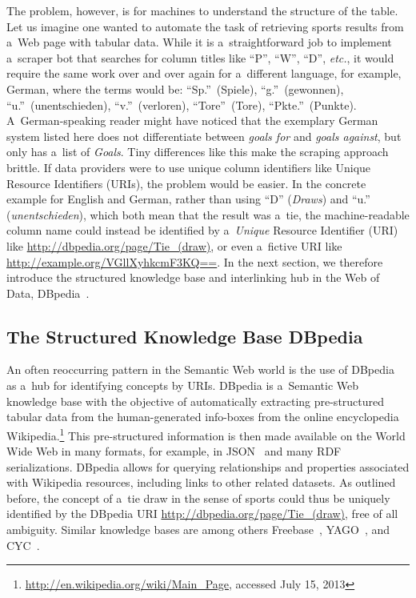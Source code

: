The problem, however, is for machines to understand
the structure of the table.
Let us imagine one wanted to automate the task
of retrieving sports results from a~Web page with tabular data.
While it is a~straightforward job to implement
a~scraper bot that searches for column titles
like ``P'', ``W'', ``D'', \emph{etc.},
it would require the same work over and over again
for a~different language,
for example, German, where the terms would be:
``Sp.''~(Spiele), ``g.''~(gewonnen), ``u.''~(unentschieden),
``v.''~(verloren), ``Tore''~(Tore), ``Pkte.''~(Punkte).
A~German-speaking reader might have noticed
that the exemplary German system listed here
does not differentiate between \emph{goals for}
and \emph{goals against}, but only has a~list of \emph{Goals}.
Tiny differences like this make the scraping approach brittle.
If data providers were to use unique column identifiers like
Unique Resource Identifiers (URIs),
the problem would be easier.
In the concrete example for English and German,
rather than using ``D'' (\emph{Draws})
and ``u.'' (\emph{unentschieden}),
which both mean that the result was a~tie,
the machine-readable column name could instead be identified by
a~\emph{Unique} Resource Identifier (URI) like
\url{http://dbpedia.org/page/Tie_(draw)},
or even a~fictive URI like \url{http://example.org/VGllXyhkcmF3KQ==}.
In the next section, we therefore introduce
the structured knowledge base and interlinking hub
in the Web of Data, DBpedia~\cite{auer2007dbpedia}.

\subsection{The Structured Knowledge Base DBpedia}

An often reoccurring pattern
in the Semantic Web world
is the use of DBpedia~\cite{auer2007dbpedia}
as a~hub for identifying concepts by URIs.
DBpedia is a~Semantic Web knowledge base
with the objective of automatically extracting
pre-structured tabular data from the human-generated info-boxes
from the online encyclopedia
Wikipedia.\footnote{\url{http://en.wikipedia.org/wiki/Main_Page},
accessed July 15, 2013}
This pre-structured information is then made available
on the World Wide Web in many formats,
for example, in JSON~\cite{crockford2006json}
and many RDF~\cite{klyne2004rdf} serializations.
DBpedia allows for querying relationships
and properties associated with Wikipedia resources,
including links to other related datasets.
As outlined before, the concept of a~tie draw
in the sense of sports could thus be uniquely identified
by the DBpedia URI \url{http://dbpedia.org/page/Tie_(draw)},
free of all ambiguity.
Similar knowledge bases are among others
Freebase~\cite{markoff2007freebase},
YAGO~\cite{suchanek2007yago}, and CYC~\cite{lenat1995cyc}.

